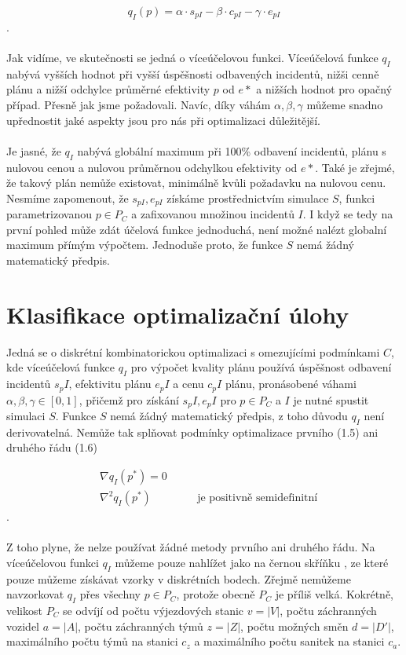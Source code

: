 $$
  q_I(p) = \alpha \cdot s_{pI} - \beta \cdot c_{pI} - \gamma \cdot e_{pI}
$$
.
\\
\\
Jak vidíme, ve skutečnosti se jedná o víceúčelovou funkci.
Víceúčelová funkce $q_I$ nabývá vyšších hodnot při vyšší úspěšnosti odbavených incidentů, nižši cenně plánu a nižší odchylce průměrné efektivity $p$ od $e*$ a nižších hodnot pro opačný případ.
Přesně jak jsme požadovali.
Navíc, díky váhám $\alpha, \beta, \gamma$ můžeme snadno upřednostit jaké aspekty jsou pro nás při optimalizaci důležitější.
\\
\\
Je jasné, že $q_I$ nabývá globální maximum při 100\% odbavení incidentů, plánu s nulovou cenou a nulovou průměrnou odchylkou efektivity od $e*$.
Také je zřejmé, že takový plán nemůže existovat, minimálně kvůli požadavku na nulovou cenu.
Nesmíme zapomenout, že $s_{pI}, e_{pI}$ získáme prostřednictvím simulace $S$, funkci parametrizovanou $p \in P_C$ a zafixovanou množinou incidentů $I$.
I když se tedy na první pohled může zdát účelová funkce jednoduchá, není možné nalézt globalní maximum přímým výpočtem.
Jednoduše proto, že funkce $S$ nemá žádný matematický předpis.

\section{Klasifikace optimalizační úlohy}

Jedná se o diskrétní kombinatorickou optimalizaci s omezujícími podmínkami $C$, kde víceúčelová funkce $q_I$ pro výpočet kvality plánu používá úspěšnost
odbavení incidentů $s_pI$, efektivitu plánu $e_pI$ a cenu $c_pI$ plánu, pronásobené váhami $\alpha, \beta, \gamma \in [0, 1]$,
přičemž pro získání $s_pI, e_pI$ pro $p \in P_C$ a $I$ je nutné spustit simulaci $S$.
Funkce $S$ nemá žádný matematický předpis, z toho důvodu $q_I$ není derivovatelná.
Nemůže tak splňovat podmínky optimalizace prvního (1.5) ani druhého řádu (1.6) %

\begin{align}
  &\nabla q_I(p^*) = 0 \\
  &\nabla^2 q_I(p^*) \hspace{50pt} \text{je positivně semidefinitní}
\end{align}
.
\\
\\
Z toho plyne, že nelze používat žádné metody prvního ani druhého řádu. %
Na víceúčelovou funkci $q_I$ můžeme pouze nahlížet jako na černou skříňku %
, ze které pouze můžeme získávat vzorky v diskrétních bodech.
Zřejmě nemůžeme navzorkovat $q_I$ přes všechny $p \in P_C$, protože obecně $P_C$ je příliš velká.
Kokrétně, velikost $P_C$ se odvíjí od počtu výjezdových stanic $v = |V|$, počtu záchranných vozidel $a = |A|$, počtu záchranných týmů $z = |Z|$, počtu možných směn $d = |D'|$, 
maximálního počtu týmů na stanici $c_z$ a maximálního počtu sanitek na stanici $c_a$.

